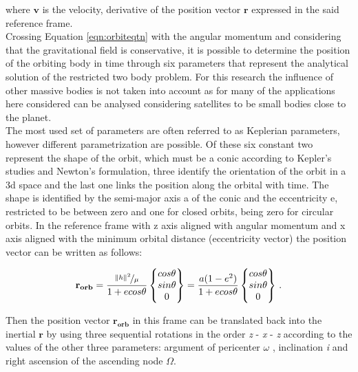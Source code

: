 where $\mathbf{v}$ is the velocity, derivative of the position vector $\mathbf{r}$ expressed in the said reference frame.\\
Crossing Equation \eqref{eqn:orbiteqtn} with the angular momentum and considering that the gravitational field is conservative, it is possible to determine the position of the orbiting body in time through six parameters that represent the analytical solution of the restricted two body problem. For this research the influence of other massive bodies is not taken into account as for many of the applications here considered can be analysed considering satellites to be small bodies close to the planet.\\
The most used set of parameters are often referred to as Keplerian parameters, however different parametrization are possible. Of these six constant two represent the shape of the orbit, which must be a conic according to Kepler's studies and Newton's formulation, three identify the orientation of the orbit in a \acrshort{3d} space and the last one links the position along the orbital with time. The shape is identified by the semi-major axis a of the conic and the eccentricity e, restricted to be between zero and one for closed orbits, being zero for circular orbits. In the reference frame with z axis aligned with angular momentum and x axis aligned with the minimum orbital distance (eccentricity vector) the position vector can be written as follows:

\begin{equation}
  \mathbf{r_{orb}} = \frac{\nicefrac{\left\lVert h\right\rVert^2}{\mu}}{1 + e cos \theta} \begin{Bmatrix} cos \theta
    \\ sin \theta
    \\ 0
  \end{Bmatrix} = \frac{a(1-e^2)}{1+ e cos \theta} \begin{Bmatrix} cos \theta
    \\ sin \theta
    \\ 0
  \end{Bmatrix} \,.
\end{equation}

Then the position vector $\mathbf{r_{orb}}$ in this frame can be translated back into the inertial $\mathbf{r}$ by using three sequential rotations in the order \textit{z} - \textit{x} - \textit{z} according to the values of the other three parameters: argument of pericenter $\omega$ , inclination \textit{i} and right ascension of the ascending node $\Omega$.

